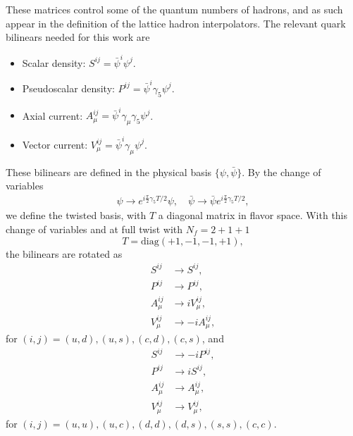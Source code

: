 These matrices control some of the quantum numbers of hadrons, and as such appear in the definition of the lattice hadron interpolators. The relevant quark bilinears needed for this work are
\begin{itemize}
\item Scalar density: $S^{ij}=\bar{\psi}^i\psi^j$.
\item Pseudoscalar density: $P^{ij}=\bar{\psi}^i\gamma_5\psi^j$.
\item Axial current: $A_{\mu}^{ij}=\bar{\psi}^i\gamma_{\mu}\gamma_5\psi^j$.
\item Vector current: $V_{\mu}^{ij}=\bar{\psi}^i\gamma_{\mu}\psi^j$.
\end{itemize}
These bilinears are defined in the physical basis $\{\psi,\bar{\psi}\}$. By the change of variables
\begin{gather}
\psi\rightarrow e^{i\frac{\pi}{2}\gamma_5T/2}\psi, \quad \bar{\psi}\rightarrow\bar{\psi}e^{i\frac{\pi}{2}\gamma_5T/2},
\end{gather}
we define the twisted basis, with $T$ a diagonal matrix in flavor space. With this change of variables and at full twist with $N_f=2+1+1$
\begin{equation}
T=\textrm{diag}(+1,-1,-1,+1),
\end{equation}
the bilinears are rotated as 
\begin{align}
S^{ij}&\rightarrow S^{ij}, \\
P^{ij}&\rightarrow P^{ij}, \\
A_{\mu}^{ij}&\rightarrow iV_{\mu}^{ij}, \\
V_{\mu}^{ij}&\rightarrow -iA_{\mu}^{ij},
\end{align}
for $(i,j)=(u,d),(u,s),(c,d),(c,s)$, and
\begin{align}
S^{ij}&\rightarrow -iP^{ij}, \\
P^{ij}&\rightarrow iS^{ij}, \\
A_{\mu}^{ij}&\rightarrow A_{\mu}^{ij}, \\
V_{\mu}^{ij}&\rightarrow V_{\mu}^{ij},
\end{align}
for $(i,j)=(u,u),(u,c),(d,d),(d,s),(s,s),(c,c)$.


